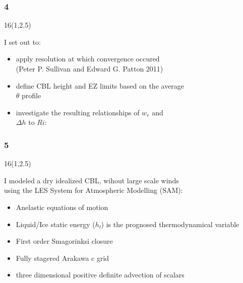 \documentclass{beamer}
\newcommand\FrameText[1]{
\begin{textblock}{16}(1,2.5)
\raggedright #1
\end{textblock}}
\begin{document}
\begin{frame}
\frametitle{4}
\fontsize{12pt}{7.2}\selectfont
\FrameText{I set out to:
\vspace{10mm}
\begin{itemize}
\item apply resolution at which convergence occured\\
(Peter P. Sullivan and Edward G. Patton 2011)
\vspace{10mm}  
\item define CBL height and EZ limits based on the average \\
$\theta$ profile
\vspace{10mm}
\item investigate the resulting relationships of $w_{e}$ and \\
 $\Delta h$ to $Ri$:
\end{itemize}
}
\end{frame}


\begin{frame}
\frametitle{5}
\fontsize{12pt}{7.2}\selectfont
\FrameText{I modeled a dry idealized CBL, wihout large scale winds\\using the LES System for Atmospheric Modelling (SAM):
\vspace{10mm}
\begin{itemize}
\item Anelastic equations of motion
\vspace{10mm} 
\item Liquid/Ice static energy ($h_{l}$) is the prognosed thermodynamical variable
\vspace{10mm}
\item First order Smagorinksi closure
\vspace{10mm}
\item Fully stagered Arakawa c grid
\vspace{10mm}
\item three dimensional positive definite advection of scalars
\end{itemize}
}
\end{frame}
\end{document}
